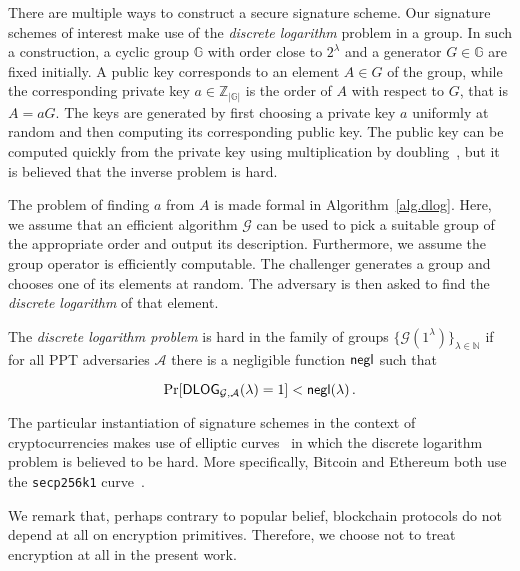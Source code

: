 There are multiple ways to construct a secure signature scheme. Our signature schemes of interest make use of the \emph{discrete logarithm} problem in a group. In such a construction, a cyclic group $\mathbb{G}$ with order close to $2^\lambda$ and a generator $G \in \mathbb{G}$ are fixed initially. A public key corresponds to an element $A \in G$ of the group, while the corresponding private key $a \in \mathbb{Z}_{|\mathbb{G}|}$ is the order of $A$ with respect to $G$, that is $A = aG$. The keys are generated by first choosing a private key $a$ uniformly at random and then computing its corresponding public key. The public key can be computed quickly from the private key using multiplication by doubling~\cite{shoup}, but it is believed that the inverse problem is hard.

The problem of finding $a$ from $A$ is made formal in Algorithm~\ref{alg.dlog}. Here, we assume that an efficient algorithm $\mathcal{G}$ can be used to pick a suitable group of the appropriate order and output its description. Furthermore, we assume the group operator is efficiently computable. The challenger generates a group and chooses one of its elements at random. The adversary is then asked to find the \emph{discrete logarithm} of that element.



\begin{definition}
  The \emph{discrete logarithm problem} is hard in the family of groups $\{\mathcal{G}(1^\lambda)\}_{\lambda \in \mathbb{N}}$ if for all PPT adversaries $\mathcal{A}$ there is a negligible function $\mathsf{negl}$ such that

  \[
    \Pr[\textsf{DLOG}_{\mathcal{G},\mathcal{A}}(\lambda) = 1] < \mathsf{negl}(\lambda)\,.
  \]
\end{definition}

The particular instantiation of signature schemes in the context of
cryptocurrencies makes use of elliptic curves~\cite{ec} in which the discrete logarithm problem is believed to be hard. More specifically, Bitcoin
and Ethereum both use the \texttt{secp256k1} curve~\cite{secp256k1}.

\begin{remark}
We remark that, perhaps contrary to popular belief, blockchain protocols
do not depend at all on encryption primitives. Therefore, we choose not to
treat encryption at all in the present work.
\end{remark}


